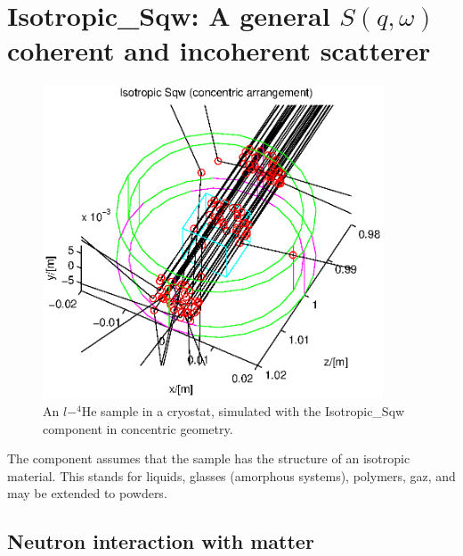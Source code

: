 \section{Isotropic\_Sqw: A general $S(q,\omega)$ coherent and incoherent scatterer}
\label{s:isotropic-sqw}


\begin{figure}
  \begin{center}
    \includegraphics[width=0.9\textwidth]{figures/sqw.eps}
  \end{center}
\caption{An $l-^4$He sample in a cryostat, simulated with the Isotropic\_Sqw component in concentric geometry.}
\label{f:isotropic-sqw}
\end{figure}

The component assumes that the sample has the structure of an isotropic material. This stands for liquids, glasses (amorphous systems), polymers, gaz, and may be extended to powders.

\subsection{Neutron interaction with matter}

